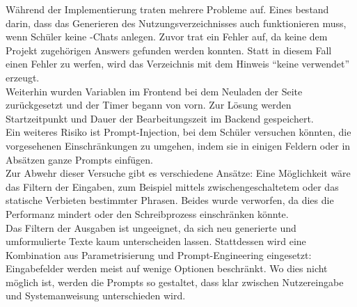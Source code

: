 \documentclass[../main.tex]{subfiles}
\begin{document}
Während der Implementierung traten mehrere Probleme auf. Eines bestand darin, dass das Generieren des Nutzungsverzeichnisses auch funktionieren muss, wenn Schüler keine -Chats anlegen. 
Zuvor trat ein Fehler auf, da keine dem Projekt zugehörigen Answers gefunden werden konnten. Statt in diesem Fall einen Fehler zu werfen, wird das Verzeichnis mit dem Hinweis 
"`keine  verwendet"' erzeugt.\\
Weiterhin wurden Variablen im Frontend bei dem Neuladen der Seite zurückgesetzt und der Timer begann von vorn. Zur Lösung werden Startzeitpunkt und Dauer der Bearbeitungszeit im Backend 
gespeichert.\\ 
Ein weiteres Risiko ist Prompt-Injection, bei dem Schüler versuchen könnten, die vorgesehenen Einschränkungen zu umgehen, indem sie in einigen Feldern oder in Absätzen ganze Prompts einfügen.\\ 
Zur Abwehr dieser Versuche gibt es verschiedene Ansätze: Eine Möglichkeit wäre das Filtern der Eingaben, zum Beispiel mittels zwischengeschaltetem  oder das statische Verbieten 
bestimmter Phrasen. Beides wurde verworfen, da dies die Performanz mindert oder den Schreibprozess einschränken könnte.\cite{promptinjection}\\
Das Filtern der Ausgaben ist ungeeignet, da sich neu generierte und umformulierte Texte kaum unterscheiden lassen. Stattdessen wird eine Kombination aus Parametrisierung und Prompt-Engineering 
eingesetzt: Eingabefelder werden meist auf wenige Optionen beschränkt. Wo dies nicht möglich ist, werden die Prompts so gestaltet, dass klar zwischen Nutzereingabe und Systemanweisung unterschieden wird.
\end{document}
